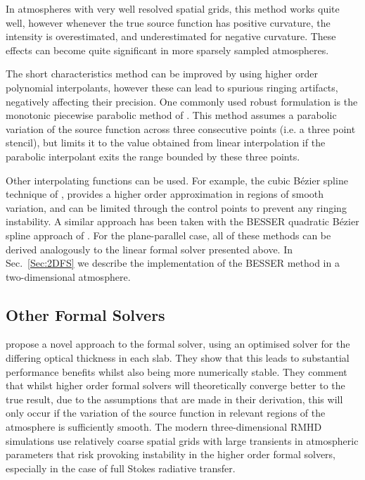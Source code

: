 In atmospheres with very well resolved spatial grids, this method works quite well, however whenever the true source function has positive curvature, the intensity is overestimated, and underestimated for negative curvature. These effects can become quite significant in more sparsely sampled atmospheres.

The short characteristics method can be improved by using higher order polynomial interpolants, however these can lead to spurious ringing artifacts, negatively affecting their precision. One commonly used robust formulation is the monotonic piecewise parabolic method of \citet{Auer1994}. This method assumes a parabolic variation of the source function across three consecutive points (i.e. a three point stencil), but limits it to the value obtained from linear interpolation if the parabolic interpolant exits the range bounded by these three points.

Other interpolating functions can be used. For example, the cubic Bézier spline technique of \citet{DelaCruzRodriguez2013}, provides a higher order approximation in regions of smooth variation, and can be limited through the control points to prevent any ringing instability. A similar approach has been taken with the BESSER quadratic Bézier spline approach of \citet{Stepan2013}.
For the plane-parallel case, all of these methods can be derived analogously to the linear formal solver presented above.
In Sec.~\ref{Sec:2DFS} we describe the implementation of the BESSER method in a two-dimensional atmosphere.

\subsection{Other Formal Solvers}

\citet{Janett2018} propose a novel approach to the formal solver,  using an optimised solver for the differing optical thickness in each slab. They show that this leads to substantial performance benefits whilst also being more numerically stable. They comment that whilst higher order formal solvers will theoretically converge better to the true result, due to the assumptions that are made in their derivation, this will only occur if the variation of the source function in relevant regions of the atmosphere is sufficiently smooth. The modern three-dimensional RMHD simulations use relatively coarse spatial grids with large transients in atmospheric parameters that risk provoking instability in the higher order formal solvers, especially in the case of full Stokes radiative transfer.

